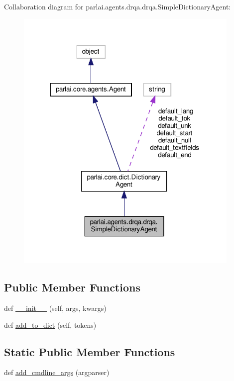 Collaboration diagram for parlai.\+agents.\+drqa.\+drqa.\+Simple\+Dictionary\+Agent\+:
\nopagebreak
\begin{figure}[H]
\begin{center}
\leavevmode
\includegraphics[width=305pt]{classparlai_1_1agents_1_1drqa_1_1drqa_1_1SimpleDictionaryAgent__coll__graph}
\end{center}
\end{figure}
\subsection*{Public Member Functions}
\begin{DoxyCompactItemize}
\item 
def \hyperlink{classparlai_1_1agents_1_1drqa_1_1drqa_1_1SimpleDictionaryAgent_ae21eeff2d5a918998ca8ea90279c9b07}{\+\_\+\+\_\+init\+\_\+\+\_\+} (self, args, kwargs)
\item 
def \hyperlink{classparlai_1_1agents_1_1drqa_1_1drqa_1_1SimpleDictionaryAgent_a5ccaf2bd28a50af2062ad2efd6a36e0e}{add\+\_\+to\+\_\+dict} (self, tokens)
\end{DoxyCompactItemize}
\subsection*{Static Public Member Functions}
\begin{DoxyCompactItemize}
\item 
def \hyperlink{classparlai_1_1agents_1_1drqa_1_1drqa_1_1SimpleDictionaryAgent_a43e40daa2e8260d919347a8e40ae3ced}{add\+\_\+cmdline\+\_\+args} (argparser)
\end{DoxyCompactItemize}
